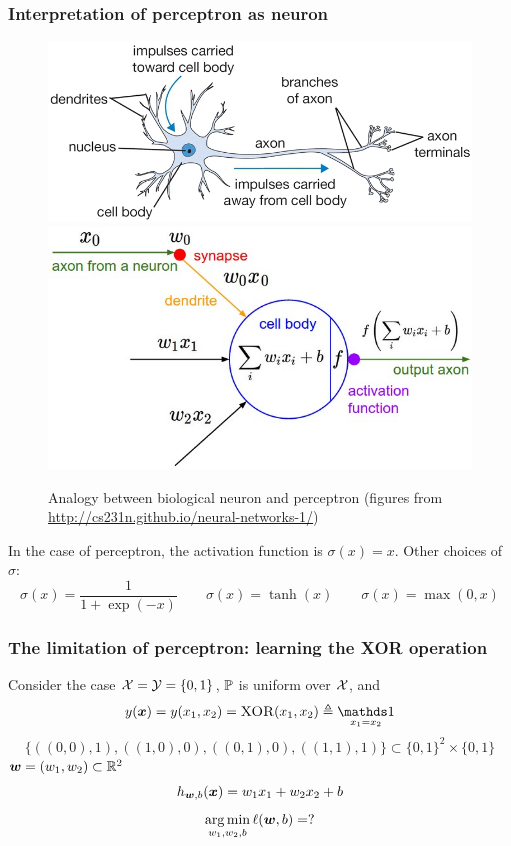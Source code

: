 \documentclass{beamer}
\DeclareMathOperator*{\argmin}{arg\,min}
\DeclareMathOperator{\ind}{{\mathds 1}}
\begin{document}
\begin{frame}

\frametitle{Interpretation of perceptron as neuron}

\begin{figure}
\centering
\includegraphics[scale=0.2, valign=t]{neuron}
\includegraphics[scale=0.2, valign=t]{neuron_model}
\caption{Analogy between biological neuron and perceptron (figures from \url{http://cs231n.github.io/neural-networks-1/})}
\end{figure}

In the case of perceptron, the activation function is $\sigma (x) = x$.
Other choices of $\sigma$:
\[
\sigma (x) = \frac1{1 + \exp (-x)} \qquad
\sigma (x) = \tanh (x) \qquad
\sigma (x) = \max (0, x)
\]

\end{frame}

\begin{frame}

\frametitle{The limitation of perceptron: learning the \textsc{XOR} operation}

Consider the case ${\mathcal X} = {\mathcal Y} = \{0, 1\}$, ${\mathbb P}$ is uniform over ${\mathcal X}$, and
\[
y(\bmx)
= y(x_1, x_2)
= \textsc{XOR} (x_1, x_2) \triangleq \ind_{x_1 = x_2}
\]
\[
\{((0, 0), 1), ((1, 0), 0), ((0, 1), 0), ((1, 1), 1)\} \subset \{0, 1\}^2 \times \{0, 1\}
\]
${\bm w} = (w_1, w_2) \subset {\mathbb R}^2$
\[
h_{{\bm w}, b} ({\bm x}) = w_1 x_1 + w_2 x_2 + b
\]
\[
\argmin_{w_1, w_2, b} \ell (\bmw, b) = ?
\]

\end{frame}
\end{document}

